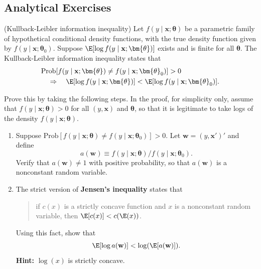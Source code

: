 
\begin{problemset}

\subsection*{Analytical Exercises}

\exercise[1] (Kullback-Leibler information inequality) \enspace Let $f(y \mid \mathbf{x}; \bm{\theta})$ be a parametric family of hypothetical conditional density functions, with the true density function given by $f(y \mid \mathbf{x}; \bm{\theta}_0)$. Suppose $\E[\log f(y \mid \mathbf{x}; \bm{\theta})]$ exists and is finite for all $\bm{\theta}$. The Kullback-Leibler information inequality states that
\begin{align*}
&\text{Prob}[f(y \mid \mathbf{x}; \bm{\theta}) \neq f(y \mid \mathbf{x}; \bm{\theta}_0)] > 0 \\
&\quad \Rightarrow \quad \E[\log f(y \mid \mathbf{x}; \bm{\theta})] < \E[\log f(y \mid \mathbf{x}; \bm{\theta}_0)].
\end{align*}

Prove this by taking the following steps. In the proof, for simplicity only, assume that $f(y \mid \mathbf{x}; \bm{\theta}) > 0$ for all $(y, \mathbf{x})$ and $\bm{\theta}$, so that it is legitimate to take logs of the density $f(y \mid \mathbf{x}; \bm{\theta})$.

\begin{enumerate}[label=(\alph*)]
\item Suppose $\text{Prob}[f(y \mid \mathbf{x}; \bm{\theta}) \neq f(y \mid \mathbf{x}; \bm{\theta}_0)] > 0$. Let $\mathbf{w} = (y, \mathbf{x}')'$ and define
\[
a(\mathbf{w}) \equiv f(y \mid \mathbf{x}; \bm{\theta}) / f(y \mid \mathbf{x}; \bm{\theta}_0).
\]
Verify that $a(\mathbf{w}) \neq 1$ with positive probability, so that $a(\mathbf{w})$ is a nonconstant random variable.

\item The strict version of \textbf{Jensen's inequality} states that
\begin{quote}
if $c(x)$ is a strictly concave function and $x$ is a nonconstant random variable, then $\E[c(x)] < c(\E(x))$.
\end{quote}
Using this fact, show that
\[
\E[\log a(\mathbf{w})] < \log(\E[a(\mathbf{w})]).
\]
\textbf{Hint:} $\log(x)$ is strictly concave.


\end{enumerate}
\end{problemset}

